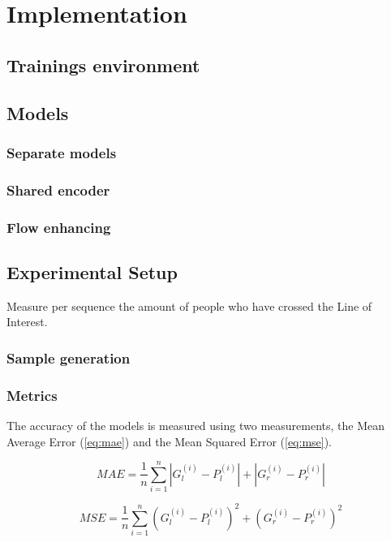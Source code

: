 \chapter{Implementation}

\section{Trainings environment}

\section{Models}
\subsection{Separate models}
\subsection{Shared encoder}
\subsection{Flow enhancing}

\section{Experimental Setup}
Measure per sequence the amount of people who have crossed the Line of Interest.

\subsection{Sample generation}

\subsection{Metrics}
The accuracy of the models is measured using two measurements, the Mean Average Error (\ref{eq:mae}) and the Mean Squared Error (\ref{eq:mse}).

\begin{equation}
\label{eq:mae}
	MAE = \frac{1}{n}\sum^n_{i=1}|G_l^{(i)}-P_l^{(i)}|+|G_r^{(i)}-P_r^{(i)}|
\end{equation}

\begin{equation}
\label{eq:mse}
	MSE = \frac{1}{n}\sum^n_{i=1}(G_l^{(i)}-P_l^{(i)})^2+(G_r^{(i)}-P_r^{(i)})^2
\end{equation}

